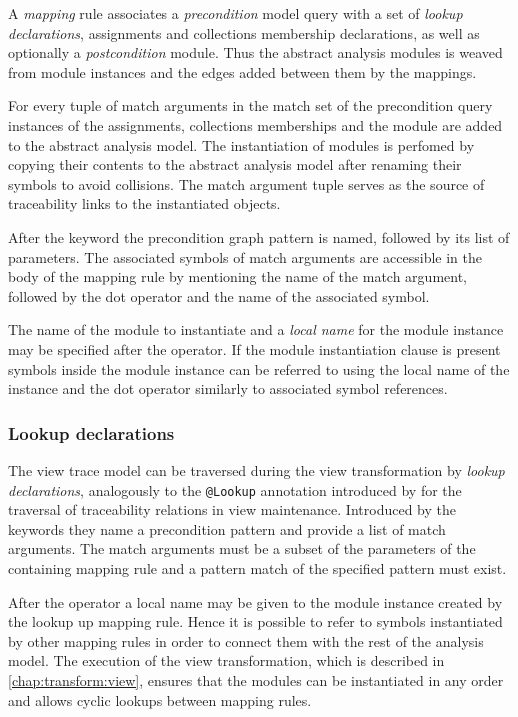 A \emph{mapping} rule associates a \emph{precondition} model query with a set of \emph{lookup declarations}, assignments and collections membership declarations, as well as optionally a \emph{postcondition}  module. Thus the abstract analysis modules is weaved from  module instances and the edges added between them by the mappings.

For every tuple of match arguments in the match set of the precondition query instances of the assignments, collections memberships and the  module are added to the abstract analysis model. The instantiation of modules is perfomed by copying their contents to the abstract analysis model after renaming their symbols to avoid collisions. The match argument tuple serves as the source of traceability links to the instantiated objects.

After the keyword  the precondition graph pattern is named, followed by its list of parameters. The associated symbols of match arguments are accessible in the body of the mapping rule by mentioning the name of the match argument, followed by the dot operator and the name of the associated symbol.

The name of the  module to instantiate and a \emph{local name} for the module instance may be specified after the \lit{=>} operator. If the module instantiation clause is present symbols inside the module instance can be referred to using the local name of the instance and the dot operator similarly to associated symbol references.

\subsubsection{Lookup declarations}

The view trace model can be traversed during the view transformation by \emph{lookup declarations}, analogously to the \texttt{@Lookup} annotation introduced by \citet{Debreceni14viewmodel} for the traversal of traceability relations in view maintenance. Introduced by the keywords  they name a precondition pattern and provide a list of match arguments. The match arguments must be a subset of the parameters of the containing mapping rule and a pattern match of the specified pattern must exist.

After the operator \lit{=>} a local name may be given to the module instance created by the lookup up mapping rule. Hence it is possible to refer to symbols instantiated by other mapping rules in order to connect them with the rest of the analysis model. The execution of the view transformation, which is described in \vref{chap:transform:view}, ensures that the modules can be instantiated in any order and allows cyclic lookups between mapping rules.

